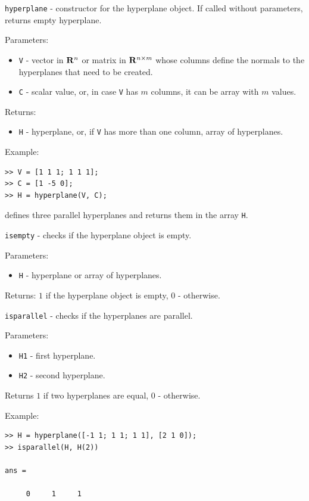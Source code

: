 \documentclass{report}
\begin{document}
\newpage

{\Large {\tt hyperplane}} - constructor for the hyperplane object.
If called without parameters, returns empty hyperplane.

Parameters:
\begin{itemize}
\item {\tt V} - vector in ${\bf R}^n$ or matrix in ${\bf R}^{n\times m}$ whose
columns define the normals to the hyperplanes that need to be created.
\item {\tt C} - scalar value, or, in case {\tt V} has $m$ columns, it can be
array with $m$ values.
\end{itemize}

Returns:
\begin{itemize}
\item {\tt H} - hyperplane, or, if {\tt V} has more than one column,
array of hyperplanes.
\end{itemize}

Example:
{\tt \begin{verbatim}
>> V = [1 1 1; 1 1 1];
>> C = [1 -5 0];
>> H = hyperplane(V, C);
\end{verbatim} }
defines three parallel hyperplanes and returns them in the array {\tt H}.

\newpage

{\Large {\tt isempty}} - checks if the hyperplane object is empty.

Parameters:
\begin{itemize}
\item {\tt H} - hyperplane or array of hyperplanes.
\end{itemize}

Returns: $1$ if the hyperplane object is empty, $0$ - otherwise.

\newpage

{\Large {\tt isparallel}} - checks if the hyperplanes are parallel.

Parameters:
\begin{itemize}
\item {\tt H1} - first hyperplane.
\item {\tt H2} - second hyperplane.
\end{itemize}

Returns $1$ if two hyperplanes are equal, $0$ - otherwise.

Example:
{\tt \begin{verbatim}
>> H = hyperplane([-1 1; 1 1; 1 1], [2 1 0]);
>> isparallel(H, H(2))

ans =

     0     1     1
\end{verbatim} }
\end{document}
